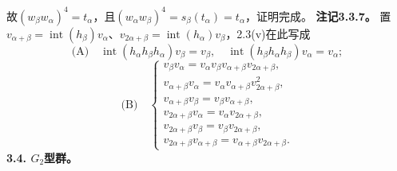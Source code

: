 故$(w_\beta w_\alpha)^4=t_\alpha$，且$(w_\alpha w_\beta)^4=s_\beta(t_\alpha)=t_\alpha$，证明完成。
\textbf{注记3.3.7。} 置$v_{\alpha+\beta}=\operatorname{int}(h_\beta)v_\alpha$、$v_{2\alpha+\beta}=\operatorname{int}(h_\alpha)v_\beta$，2.3(v)在此写成
\[\text{(A)}\quad\operatorname{int}(h_\alpha h_\beta h_\alpha)v_\beta=v_\beta,\quad\operatorname{int}(h_\beta h_\alpha h_\beta)v_\alpha=v_\alpha;\]
\[\text{(B)}\quad\begin{cases}v_\beta v_\alpha=v_\alpha v_\beta v_{\alpha+\beta}v_{2\alpha+\beta},\\v_{\alpha+\beta}v_\alpha=v_\alpha v_{\alpha+\beta}v_{2\alpha+\beta}^{2},\\v_{\alpha+\beta}v_\beta=v_\beta v_{\alpha+\beta},\\v_{2\alpha+\beta}v_\alpha=v_\alpha v_{2\alpha+\beta},\\v_{2\alpha+\beta}v_\beta=v_\beta v_{2\alpha+\beta},\\v_{2\alpha+\beta}v_{\alpha+\beta}=v_{\alpha+\beta}v_{2\alpha+\beta}.\end{cases}\]
\textbf{3.4. $G_2$型群。}
